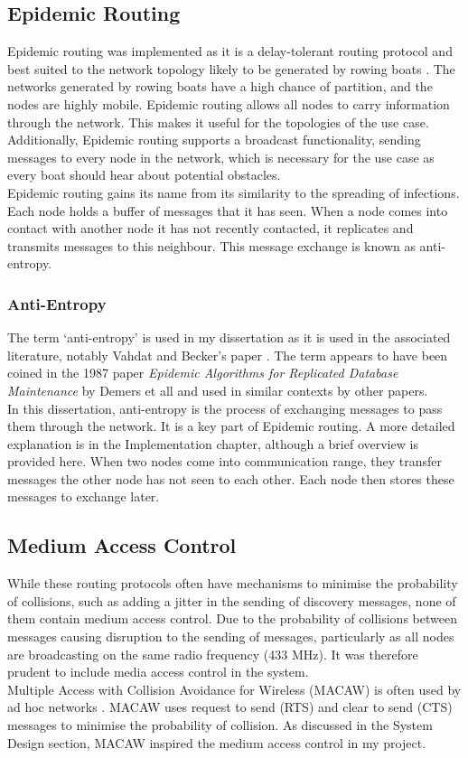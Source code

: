 \documentclass[12pt,a4paper]{report}
\begin{document}
\subsection{Epidemic Routing}
Epidemic routing was implemented as it is a delay-tolerant routing protocol and best suited to the network topology likely to be generated by rowing boats \cite{epidemic}. The networks generated by rowing boats have a high chance of partition, and the nodes are highly mobile. Epidemic routing allows all nodes to carry information through the network. This makes it useful for the topologies of the use case. Additionally, Epidemic routing supports a broadcast functionality, sending messages to every node in the network, which is necessary for the use case as every boat should hear about potential obstacles. \\
Epidemic routing gains its name from its similarity to the spreading of infections. Each node holds a buffer of messages that it has seen. When a node comes into contact with another node it has not recently contacted, it replicates and transmits messages to this neighbour. This message exchange is known as anti-entropy.

\subsubsection{Anti-Entropy}
The term `anti-entropy' is used in my dissertation as it is used in the associated literature, notably Vahdat and Becker's paper \cite{epidemic}. The term appears to have been coined in the 1987 paper \emph{Epidemic Algorithms for Replicated Database Maintenance} by Demers et all \cite{demers} and used in similar contexts by other papers. \\
In this dissertation, anti-entropy is the process of exchanging messages to pass them through the network. It is a key part of Epidemic routing. A more detailed explanation is in the Implementation chapter, although a brief overview is provided here.
When two nodes come into communication range, they transfer messages the other node has not seen to each other. Each node then stores these messages to exchange later. \\

\subsection{Medium Access Control}
While these routing protocols often have mechanisms to minimise the probability of collisions, such as adding a jitter in the sending of discovery messages, none of them contain medium access control. Due to the probability of collisions between messages causing disruption to the sending of messages, particularly as all nodes are broadcasting on the same radio frequency (433 MHz). It was  therefore prudent to include media access control in the system. \\
Multiple Access with Collision Avoidance for Wireless (MACAW) is often used by ad hoc networks \cite{macaw}. MACAW uses request to send (RTS) and clear to send (CTS) messages to minimise the probability of collision. As discussed in the System Design section, MACAW inspired the medium access control in my project. \\
\end{document}
